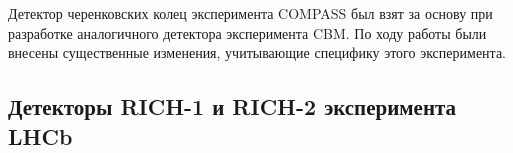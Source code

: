 
Детектор черенковских колец эксперимента COMPASS был взят за основу при разработке аналогичного детектора эксперимента CBM. По ходу работы были внесены существенные изменения, учитывающие специфику этого эксперимента.


\subsection{Детекторы \mbox{RICH-1} и \mbox{RICH-2} эксперимента LHCb}\label{sec:LHCb}



